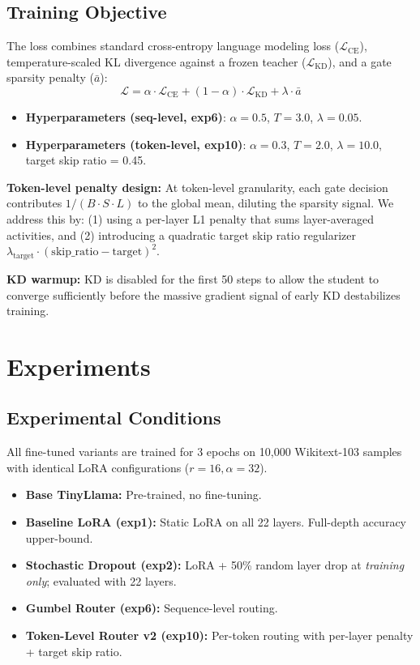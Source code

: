 \documentclass[conference]{IEEEtran}
\begin{document}
\subsection{Training Objective}
The loss combines standard cross-entropy language modeling loss ($\mathcal{L}_{\text{CE}}$), temperature-scaled KL divergence against a frozen teacher ($\mathcal{L}_{\text{KD}}$), and a gate sparsity penalty ($\bar{a}$):
\begin{equation}
\mathcal{L} = \alpha \cdot \mathcal{L}_{\text{CE}} + (1-\alpha) \cdot \mathcal{L}_{\text{KD}} + \lambda \cdot \bar{a}
\end{equation}
\begin{itemize}
    \item \textbf{Hyperparameters (seq-level, exp6)}: $\alpha = 0.5$, $T = 3.0$, $\lambda = 0.05$.
    \item \textbf{Hyperparameters (token-level, exp10)}: $\alpha = 0.3$, $T = 2.0$, $\lambda = 10.0$, target skip ratio = 0.45.
\end{itemize}

\textbf{Token-level penalty design:} At token-level granularity, each gate decision contributes $1/(B \cdot S \cdot L)$ to the global mean, diluting the sparsity signal. We address this by: (1) using a per-layer L1 penalty that sums layer-averaged activities, and (2) introducing a quadratic target skip ratio regularizer $\lambda_{\text{target}} \cdot (\text{skip\_ratio} - \text{target})^2$.

\textbf{KD warmup:} KD is disabled for the first 50 steps to allow the student to converge sufficiently before the massive gradient signal of early KD destabilizes training.

\section{Experiments}
\subsection{Experimental Conditions}
All fine-tuned variants are trained for 3 epochs on 10,000 Wikitext-103 samples with identical LoRA configurations ($r=16, \alpha=32$).
\begin{itemize}
    \item \textbf{Base TinyLlama:} Pre-trained, no fine-tuning.
    \item \textbf{Baseline LoRA (exp1):} Static LoRA on all 22 layers. Full-depth accuracy upper-bound.
    \item \textbf{Stochastic Dropout (exp2):} LoRA + 50\% random layer drop at \textit{training only}; evaluated with 22 layers.
    \item \textbf{Gumbel Router (exp6):} Sequence-level routing.
    \item \textbf{Token-Level Router v2 (exp10):} Per-token routing with per-layer penalty + target skip ratio.
\end{itemize}
\end{document}
